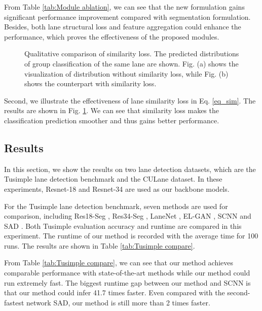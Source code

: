 \documentclass[runningheads]{llncs}
\begin{document}
From Table \ref{tab:Module ablation}, we can see that the new formulation gains significant performance improvement compared with segmentation formulation. Besides, both lane structural loss and feature aggregation could enhance the performance, which proves the effectiveness of the proposed modules. 

\begin{figure}[h]
	
	\centering
	\caption{Qualitative comparison of similarity loss. The predicted distributions of group classification of the same lane are shown. Fig. (a) shows the visualization of distribution without similarity loss, while Fig. (b) shows the counterpart with similarity loss.}
	\label{fig_col_test}
	\vspace{-10pt}
\end{figure}




Second, we illustrate the effectiveness of lane similarity loss in Eq. \ref{eq_sim}. The results are shown in Fig. \ref{fig_col_test}. We can see that similarity loss makes the classification prediction smoother and thus gains better performance.






\subsection{Results}
In this section, we show the results on two lane detection datasets, which are the Tusimple lane detection benchmark and the CULane dataset. In these experiments, Resnet-18 and Resnet-34 \cite{resnet} are used as our backbone models.

For the Tusimple lane detection benchmark, seven methods are used for comparison, including Res18-Seg \cite{chen2017deeplab}, Res34-Seg \cite{chen2017deeplab}, LaneNet \cite{End-to-End}, EL-GAN \cite{ghafoorian2018gan}, SCNN \cite{SCNN} and SAD \cite{SAD}. Both Tusimple evaluation accuracy and runtime are compared in this experiment. The runtime of our method is recorded with the average time for 100 runs. The results are shown in Table \ref{tab:Tusimple compare}.


From Table \ref{tab:Tusimple compare}, we can see that our method achieves comparable performance with state-of-the-art methods while our method could run extremely fast. The biggest runtime gap between our method and SCNN is that our method could infer 41.7 times faster. Even compared with the second-fastest network SAD, our method is still more than 2 times faster. 
\end{document}
